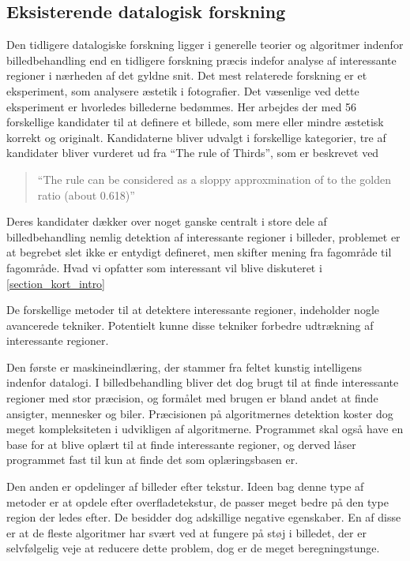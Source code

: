 {\subsection{Eksisterende datalogisk forskning}
Den tidligere datalogiske forskning ligger i generelle teorier og algoritmer
indenfor billedbehandling end en tidligere forskning præcis indefor analyse af
interessante regioner i nærheden af det gyldne snit.
Det mest relaterede forskning er et eksperiment, som analysere æstetik i fotografier\cite{DattaWang}.
Det væsenlige ved dette eksperiment er hvorledes billederne
bedømmes. Her arbejdes der med 56 forskellige kandidater til at definere
et billede, som mere eller mindre æstetisk korrekt og originalt. 
Kandidaterne bliver udvalgt i forskellige kategorier, tre af kandidater 
bliver vurderet ud fra ``The rule of Thirds'', som er beskrevet ved
\begin{quote}
	``The rule can be considered as a sloppy approxmination of to the
	golden ratio (about 0.618)''
\end{quote}

Deres kandidater dækker over noget ganske centralt i store dele af
billedbehandling nemlig detektion af
interessante regioner i billeder, problemet er at begrebet slet ikke er
entydigt defineret, men skifter mening fra fagområde til fagområde.
Hvad vi opfatter som interessant vil blive diskuteret i \ref{section_kort_intro}

De forskellige metoder til at detektere interessante regioner, indeholder nogle avancerede tekniker.
Potentielt kunne disse tekniker forbedre udtrækning af interessante regioner.

Den første er maskineindlæring, der stammer fra feltet kunstig
intelligens indenfor datalogi. I billedbehandling bliver det dog
brugt til at finde interessante regioner med stor præcision, og formålet
med brugen er bland andet at finde ansigter, mennesker og
biler\cite{ViolaJones01,SchneidermanKanade00,Gabor}. Præcisionen på
algoritmernes detektion koster dog meget kompleksiteten i udvikligen 
af algoritmerne. Programmet skal også have en base for at blive oplært
til at finde interessante regioner, og derved låser programmet fast til
kun at finde det som oplæringsbasen er.

Den anden er opdelinger af billeder efter tekstur. Ideen bag denne type
af metoder er at opdele efter
overfladetekstur\cite{218442,CarsonBelongie02,PapageorgiouPoggio}, de passer meget bedre på
den type region der ledes efter. De besidder dog adskillige
negative egenskaber. En af disse er at de fleste algoritmer har svært
ved at fungere på støj i billedet, der er selvfølgelig veje at reducere
dette problem, dog er de meget beregningstunge.\cite{PalPal}

}
